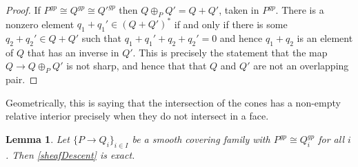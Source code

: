 \documentclass[12pt]{amsart}
\numberwithin{equation}{section}
\theoremstyle{plain}
\newtheorem{lem}[equation]{Lemma}
\theoremstyle{remark}
\begin{document}
\begin{proof}
	If $P^{gp}\cong Q^{gp} \cong Q'^{gp}$ then $Q\oplus_P Q'= Q + Q'$, taken in $P^{gp}$. There is a nonzero element $q_1 + q_1'\in (Q+Q')^*$ if and only if there is some $q_2 + q_2'\in Q + Q'$ such that $q_1 + q_1' + q_2 + q_2' = 0$ and hence $q_1 + q_2$ is an element of $Q$ that has an inverse in $Q'$. This is precisely the statement that the map $Q\to Q\oplus_P Q'$ is not sharp, and hence that that $Q$ and $Q'$ are not an overlapping pair.  
\end{proof}
Geometrically, this is saying that the intersection of the cones has a non-empty relative interior precisely when they do not intersect in a face.

\begin{lem}\label{ArbCovSameGrp}
	Let $\{P\to Q_i\}_{i\in I}$ be a smooth covering family with $P^{gp}\cong Q_i^{gp}$ for all $i$. Then \eqref{sheafDescent} is exact.
\end{lem}
\end{document}
